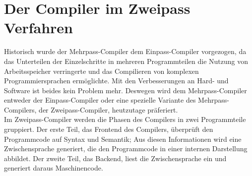 \chapter{Der Compiler im Zweipass Verfahren}
\label{chap:theory:zweipassCompiler}

Historisch wurde der Mehrpass-Compiler dem Einpass-Compiler vorgezogen, da das Unterteilen der Einzelschritte in mehreren Programmteilen die Nutzung von Arbeitsspeicher verringerte und das Compilieren von komplexen Programmiersprachen ermöglichte.
Mit den Verbesserungen an Hard- und Software ist beides kein Problem mehr.
Deswegen wird dem Mehrpass-Compiler entweder der Einpass-Compiler oder eine spezielle Variante des Mehrpass-Compilers, der Zweipass-Compiler, heutzutage präferiert\cite{mossenbock:2024}.\\
Im Zweipass-Compiler werden die Phasen des Compilers in zwei Programmteile gruppiert.
Der erste Teil, das Frontend des Compilers, überprüft den Programmcode auf Syntax und Semantik;
Aus diesen Informationen wird eine Zwischensprache generiert, die den Programmcode in einer internen Darstellung abbildet.
Der zweite Teil, das Backend, liest die Zwischensprache ein und generiert daraus Maschinencode.\\

